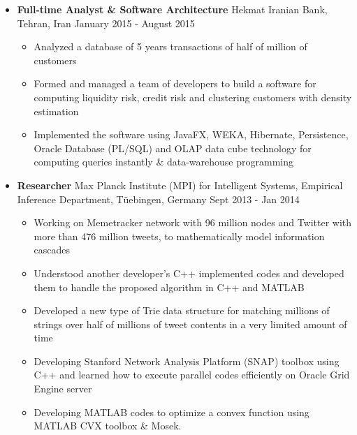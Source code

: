 \documentclass[letter]{res}
\begin{document}
\begin{resume}
\begin{itemize}[leftmargin=-.1in]
\item \textbf{Full-time Analyst \& Software Architecture} \newline
Hekmat Iranian Bank, Tehran, Iran \hfill January 2015 - August 2015\\
  \vspace{-4mm}
  \iflong
    \begin{itemize}
        \item Analyzed a database of 5 years transactions of half of million of customers
        \item Formed and managed a team of developers to build a software for computing liquidity risk, credit risk and clustering customers with density estimation
        \item Implemented the software using JavaFX, WEKA, Hibernate, Persistence, Oracle Database (PL/SQL) and OLAP data cube technology for computing queries instantly \& data-warehouse programming
    \end{itemize}
  \fi
  
\item \textbf{Researcher} \newline
Max Planck Institute (MPI) for Intelligent Systems, Empirical Inference Department, Tüebingen, Germany \hfill {\footnotesize Sept 2013 - Jan 2014}\\
    \vspace{-4mm}
    \iflong
      \begin{itemize}
          \item Working on Memetracker network with 96 million nodes and Twitter with more than 476 million tweets, to mathematically model information cascades
          \item Understood another developer's C++ implemented codes and developed them to handle the proposed algorithm in C++ and MATLAB
          \item Developed a new type of Trie data structure for matching millions of strings over half of millions of tweet contents in a very limited amount of time
          \item Developing Stanford Network Analysis Platform (SNAP) toolbox using C++ and learned how to execute parallel codes efficiently on Oracle Grid Engine server
          \item Developing MATLAB codes to optimize a convex function using MATLAB CVX toolbox \& Mosek.
      \end{itemize}
    \fi
  

\end{itemize}
\end{resume}
\end{document}
